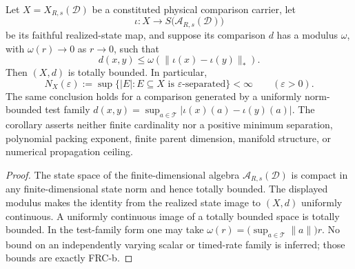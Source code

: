 \documentclass[12pt,a4paper]{article}
\begin{document}
\begin{corollary}
\label{p2:cor:gp1-tb}
Let \(X=X_{R,s}(\mathcal D)\) be a constituted physical comparison carrier,
let
\[
 \iota:X\longrightarrow S\bigl(\mathcal A_{R,s}(\mathcal D)\bigr)
\]
be its faithful realized-state map, and suppose its comparison \(d\) has a
modulus \(\omega\), with \(\omega(r)\to0\) as \(r\to0\), such that
\[
 d(x,y)\le
 \omega\!\left(\|\iota(x)-\iota(y)\|_*\right).
\]
Then \((X,d)\) is totally bounded.  In particular,
\[
 N_X(\varepsilon)
 :=\sup\{|E|:E\subseteq X\text{ is }\varepsilon\text{-separated}\}
 <\infty
 \qquad(\varepsilon>0).
\]
The same conclusion holds for a comparison generated by a uniformly
norm-bounded test family
\(d(x,y)=\sup_{a\in\mathcal T}|\iota(x)(a)-\iota(y)(a)|\).
The corollary asserts neither finite cardinality nor a positive minimum
separation, polynomial packing exponent, finite parent dimension, manifold
structure, or numerical propagation ceiling.
\end{corollary}

\begin{proof}
The state space of the finite-dimensional algebra
\(\mathcal A_{R,s}(\mathcal D)\) is compact in any finite-dimensional state
norm and hence totally bounded.  The displayed modulus makes the identity
from the realized state image to \((X,d)\) uniformly continuous.  A uniformly
continuous image of a totally bounded space is totally bounded.  In the
test-family form one may take
\(\omega(r)=\bigl(\sup_{a\in\mathcal T}\|a\|\bigr)r\).
No bound on an independently varying scalar or timed-rate family is inferred;
those bounds are exactly FRC-b.
\end{proof}
\end{document}

